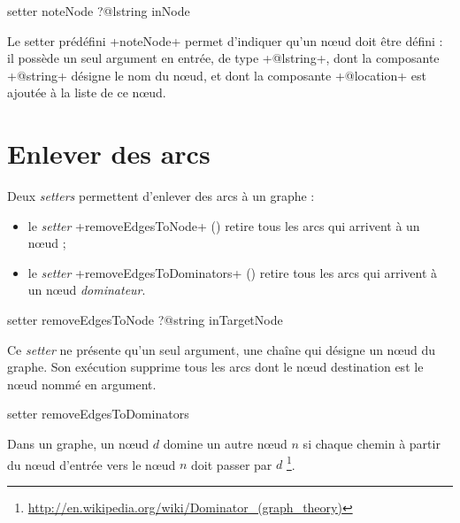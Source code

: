 
\begin{galgas}
setter noteNode ?@lstring inNode 
\end{galgas}

Le setter prédéfini \ggs+noteNode+ permet d'indiquer qu'un nœud doit être défini : il possède un seul argument en entrée, de type \ggs+@lstring+, dont la composante \ggs+@string+ désigne le nom du nœud, et dont la composante \ggs+@location+ est ajoutée à la liste de ce nœud.



\section{Enlever des arcs}

Deux \emph{setters} permettent d'enlever des arcs à un graphe :
\begin{itemize}
  \item le \emph{setter} \ggs+removeEdgesToNode+ () retire tous les arcs qui arrivent à un nœud ;
  \item le \emph{setter} \ggs+removeEdgesToDominators+ () retire tous les arcs qui arrivent à un nœud \emph{dominateur}.
\end{itemize}




\begin{galgas}
setter removeEdgesToNode ?@string inTargetNode 
\end{galgas}

Ce \emph{setter} ne présente qu'un seul argument, une chaîne qui désigne un nœud du graphe. Son exécution supprime tous les arcs dont le nœud destination est le nœud nommé en argument.


\begin{galgas}
setter removeEdgesToDominators 
\end{galgas}

Dans un graphe, un nœud $d$ domine un autre nœud $n$ si chaque chemin à partir du nœud d'entrée vers le nœud $n$ doit passer par $d$ \footnote{\url{http://en.wikipedia.org/wiki/Dominator_(graph_theory)}}.

